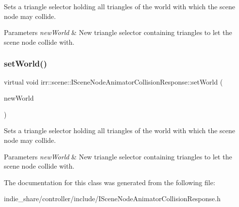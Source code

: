 Sets a triangle selector holding all triangles of the world with which the scene node may collide. 


\begin{DoxyParams}{Parameters}
{\em new\+World} & New triangle selector containing triangles to let the scene node collide with. \\
\hline
\end{DoxyParams}
\mbox{\label{classirr_1_1scene_1_1ISceneNodeAnimatorCollisionResponse_a42aa84d4843a734f8dd1f20b5c92ef06}} 
\subsubsection{\texorpdfstring{set\+World()}{setWorld()}\hspace{0.1cm}{\footnotesize\ttfamily [2/2]}}
{\footnotesize\ttfamily virtual void irr\+::scene\+::\+I\+Scene\+Node\+Animator\+Collision\+Response\+::set\+World (\begin{DoxyParamCaption}\item[{\hyperlink{classirr_1_1scene_1_1ITriangleSelector}{I\+Triangle\+Selector} $\ast$}]{new\+World }\end{DoxyParamCaption})\hspace{0.3cm}{\ttfamily [pure virtual]}}



Sets a triangle selector holding all triangles of the world with which the scene node may collide. 


\begin{DoxyParams}{Parameters}
{\em new\+World} & New triangle selector containing triangles to let the scene node collide with. \\
\hline
\end{DoxyParams}


The documentation for this class was generated from the following file\+:\begin{DoxyCompactItemize}
\item 
indie\+\_\+share/controller/include/I\+Scene\+Node\+Animator\+Collision\+Response.\+h\end{DoxyCompactItemize}
